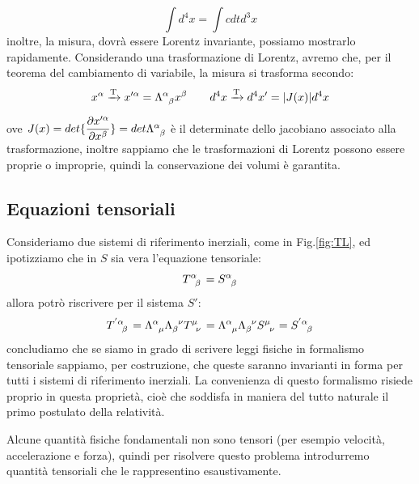 \begin{equation}
\int d^4x=\int cdt d^3x
\end{equation}
inoltre, la misura, dovrà essere Lorentz invariante, possiamo mostrarlo rapidamente.
Considerando una trasformazione di Lorentz, avremo che, per il teorema del cambiamento di variabile, la misura si trasforma secondo:
\begin{equation}
  x^{\alpha}\xrightarrow[\text{}]{\text{T}}x'^{\alpha}=\Lambda\indices{^\alpha_\beta} x^{\beta} \qquad d^4x\xrightarrow[\text{}]{\text{T}}d^4x'=|J(x)|d^4x
\end{equation}
ove $J(x)=det\{ \dfrac{\partial x'^\alpha}{\partial x^\beta}\}=det\Lambda\indices{^\alpha_\beta}$ è il determinate dello jacobiano associato alla trasformazione, inoltre sappiamo che le trasformazioni di Lorentz possono essere proprie o improprie, quindi la conservazione dei volumi è garantita.


\subsection{Equazioni tensoriali}\label{sec:1.5}
Consideriamo due sistemi di riferimento inerziali, come in Fig.\ref{fig:TL}, ed ipotizziamo che in $S$ sia vera l'equazione tensoriale:
\begin{equation*}
    T\indices{^\alpha_\beta}=S\indices{^\alpha_\beta}
\end{equation*}
allora potrò riscrivere per il sistema $S'$:
\begin{equation*}
   T\indices{^'^\alpha_\beta} =\Lambda\indices{^\alpha_\mu}\Lambda\indices{_\beta^\nu}T\indices{^\mu_\nu}=\Lambda\indices{^\alpha_\mu}\Lambda\indices{_\beta^\nu}S\indices{^\mu_\nu}=S\indices{^'^\alpha_\beta}
\end{equation*}
concludiamo che se siamo in grado di scrivere leggi fisiche in formalismo tensoriale sappiamo, per costruzione, che queste saranno invarianti in forma per tutti i sistemi di riferimento inerziali. La convenienza di questo formalismo risiede proprio in questa proprietà, cioè che soddisfa in maniera del tutto naturale il primo postulato della relatività.

Alcune quantità fisiche fondamentali non sono tensori (per esempio velocità, accelerazione e forza), quindi per risolvere questo problema introdurremo quantità tensoriali che le rappresentino esaustivamente.


